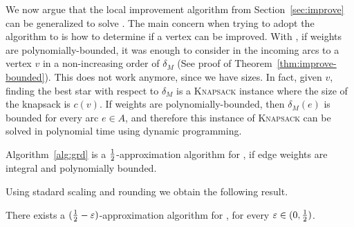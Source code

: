 
We now argue that the local improvement algorithm from
Section~\ref{sec:improve} can be generalized to solve \gcp.
%
The main concern when trying to adopt the algorithm to \gcp is how to
determine if a vertex can be improved.
%
With \carpool, if weights are polynomially-bounded, it was enough to
consider in the incoming arcs to a vertex $v$ in a non-increasing
order of $\delta_M$ (See proof of Theorem~\ref{thm:improve-bounded}).
This does not work anymore, since \gcp we have sizes.  In fact, given
$v$, finding the best star with respect to $\delta_M$ is
a \textsc{Knapsack} instance where the size of the knapsack is $c(v)$.
%
If weights are polynomially-bounded, then $\delta_M(e)$ is bounded for
every arc $e \in A$, and therefore this instance of \textsc{Knapsack}
can be solved in polynomial time using dynamic programming.

\begin{theorem}
Algorithm~\ref{alg:grd} is a $\frac{1}{2}$-approximation algorithm for \gcp,
if edge weights are integral and polynomially bounded.
\end{theorem}

Using stadard scaling and rounding we obtain the following result.

\begin{theorem}
There exists a $(\frac{1}{2}-\varepsilon)$-approximation algorithm for \gcp,
for every $\varepsilon \in (0,\frac{1}{2})$.
\end{theorem}
